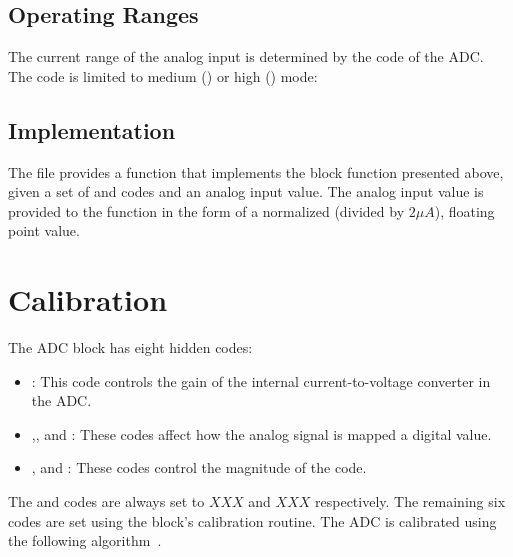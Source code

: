 \subsection{Operating Ranges}

The current range of the analog input  is determined by the  code of the
ADC. The  code is limited to medium () or high () mode:

\begin{algorithmic}
\end{algorithmic}


\subsection{\analoglib Implementation}

The  file provides a  function that implements the
block function presented above, given a set of \dynamic and \static codes and an
analog input value. The analog input value is provided to the function in the
form of a normalized (divided by $2 \mu A$), floating point value. 


\section{Calibration}
The ADC block has eight hidden codes:

\begin{itemize}
\item{}: This code controls the gain of the internal current-to-voltage
  converter in the ADC.
\item{},, and : These codes affect
  how the analog signal is mapped a digital value.
\item{},  and : These codes control the magnitude of the
   code.
\end{itemize}

The  and  codes are always set to $XXX$ and $XXX$
respectively.  The remaining six codes are set using the block's calibration
routine. The ADC is calibrated using the following
algorithm~\cite{adc_calib.cpp}.

